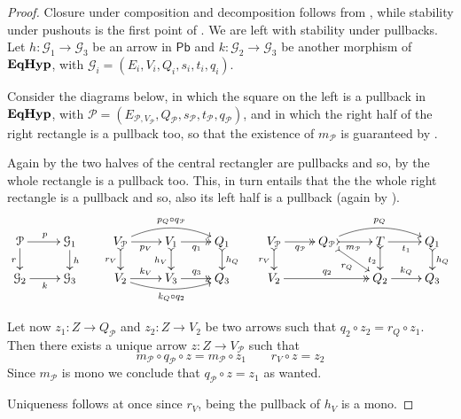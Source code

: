 \documentclass[a4paper,UKenglish,cleveref,pdftex,thm-restate,numberwithinsect]{lipics-v2021}
\newcommand{\pbc}{\mathsf{Pb}}
\newcommand{\catname}[1]{\textbf{\textup{#1}}}
\newcommand{\EqHyp}{\catname{EqHyp}} %
\begin{document}
\begin{proof}\label{proof:pbmono}
	Closure under composition and decomposition follows from , while stability under pushouts is the first point of . We are left with stability under pullbacks. 
	Let $h\colon \mathcal{G}_1\to \mathcal{G}_3$ be an arrow in $\pbc$ and $k\colon \mathcal{G}_2\to \mathcal{G}_3$ be another morphism of $\EqHyp$, with $\mathcal{G}_{i}=(E_i, V_i, Q_i, s_i, t_i, q_i)$.
	
	Consider the diagrams below, in which the square on the left is a pullback in $\EqHyp$, with $\mathcal{P}=(E_{\mathcal{P}, V_{\mathcal{P}}}, Q_{\mathcal{P}}, s_{\mathcal{P}}, t_{\mathcal{P}}, q_{\mathcal{P}})$, and in which the right half of the right rectangle is a pullback too, so that the existence of $m_\mathcal{P}$ is guaranteed by . 
	
	Again by  the two halves of the central rectangler are pullbacks and so, by  the whole rectangle is a pullback too. This, in turn entails that the the whole right rectangle is a pullback and so, also its left half is a pullback (again by ).
	\[
	\xymatrix@R=15pt{\mathcal{P} \ar[r]^{p} \ar[d]_{r}&  \mathcal{G}_1 \ar[d]^{h} &
		V_{\mathcal{P}} \ar@/^.4cm/[rr]^{p_Q\circ q_{\mathcal{P}}} \ar[r]_{p_V} \ar@{>->}[d]_{r_V}& V_1  \ar@{>>}[r]_{q_1} \ar@{>->}[d]_{h_V}& Q_1 \ar@{>->}[d]^{h_Q}& V_{\mathcal{P}} \ar@{>>}[r]_{q_{\mathcal{P}}} \ar@{>->}[d]_{r_V} & Q_{\mathcal{P}} \ar@{>->}[dr]_{r_Q} \ar@/^.4cm/[rr]^{p_Q} \ar@{>->}[r]_{m_{\mathcal{P}}}& T \ar[r]_{t_1} \ar@{>->}[d]_{t_2} & Q_1 \ar@{>->}[d]^{h_Q}\\
		\mathcal{G}_2 \ar[r]_{k} & \mathcal{G}_3 &   V_2  \ar@/_.3cm/[rr]_{k_Q\circ q_2}\ar[r]^{k_V}& V_3 \ar@{>>}[r]^{q_3} & Q_3 &V_2 \ar@{>>}[rr]^{q_2}&& Q_2 \ar[r]^{k_Q} & Q_3 }
	\]
	
	
	
	Let now $z_1\colon Z\to Q_{\mathcal{P}}$ and $z_2\colon Z\to V_2$ be two arrows such that $q_2\circ z_2=r_Q\circ z_1$. Then there exists a unique arrow $z\colon Z\to V_{\mathcal{P}}$ such that
	\[m_{\mathcal{P}}\circ q_{\mathcal{P}}\circ z= m_{\mathcal{P}}\circ z_1 \qquad r_V\circ z=z_2\]
	Since $m_\mathcal{P}$ is mono we conclude that $q_{\mathcal{P}}\circ z=z_1$ as wanted.
	
	Uniqueness follows at once since $r_V$, being the pullback of $h_V$ is a mono.
\end{proof}

\pbs*
\end{document}
